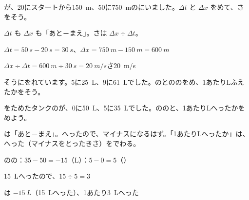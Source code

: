 \begin{reidai}[$\Delta$ を\R{使}{つか}って\R{速}{はや}さを\R{求}{もと}める]
が、20にスタートから\qty{150}{m}、50に\qty{750}{m}のにいました。$\Delta t$ と $\Delta x$ をめて、さをそう。\par
\kangaekata $\Delta t$ も $\Delta x$ も「あと－まえ」。さは $\Delta x\div\Delta t$。\par
\shiki $\Delta t=\qty{50}{s}-\qty{20}{s}=\qty{30}{s}$、$\Delta x=\qty{750}{m}-\qty{150}{m}=\qty{600}{m}$\par
\hspace*{2.6\zw}$\Delta x\div\Delta t=\qty{600}{m}\div\qty{30}{s}=\qty{20}{m/s}$\kotaenext{}さ\qty{20}{m/s}
\end{reidai}

\begin{jibun}
そうにをれています。5に\qty{25}{L}、9に\qty{61}{L}でした。のとののをめ、1あたりLふえたかをそう。
\end{jibun}

\begin{reidai}
をためたタンクのが、0に\qty{50}{L}、5に\qty{35}{L}でした。ののと、1あたりLへったかをめよう。\par
\kangaekata {}は「あと－まえ」。へったので、マイナスになるはず。「1あたりLへったか」は、へった（マイナスをとったきさ）をでわる。\par
\shiki {}のの：$35-50=-15$（L）\quad{}：$5-0=5$（）\par
\hspace*{2.6\zw}\qty{15}{L}へったので、$15\div5=3$\par
\kotae {}は $\qty{-15}{L}$（\qty{15}{L}へった）、1あたり\qty{3}{L}へった
\end{reidai}

